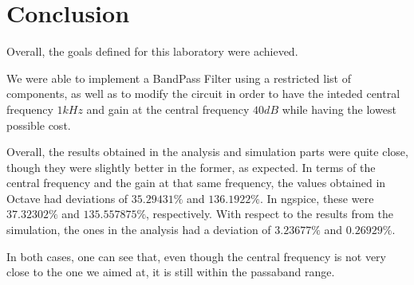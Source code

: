 \section{Conclusion}
\label{sec:conclusion}


Overall, the goals defined for this laboratory were achieved.

We were able to implement a BandPass Filter using a restricted list of components, as well as to modify the circuit in order to have the inteded central frequency $1kHz$ and gain at the central frequency $40 dB$ while having the lowest possible cost.

Overall, the results obtained in the analysis and simulation parts were quite close, though they were slightly better in the former, as expected. In terms of the central frequency and the gain at that same frequency, the values obtained in Octave had deviations of $35.29431 \%$ and $136.1922 \%$. In ngspice, these were $37.32302\%$ and $135.557875 \%$, respectively. With respect to the results from the simulation, the ones in the analysis had a deviation of $3.23677\%$ and $0.26929\%$.


In both cases, one can see that, even though the central frequency is not very close to the one we aimed at, it is still within the passaband range.
